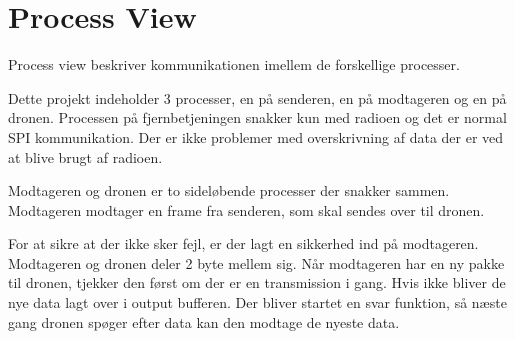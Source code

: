 \documentclass[Main]{subfiles}
\begin{document}
\section{Process View}
Process view beskriver kommunikationen imellem de forskellige processer.

Dette projekt indeholder 3 processer, en på senderen, en på modtageren og en på dronen.
Processen på fjernbetjeningen snakker kun med radioen og det er normal SPI kommunikation. Der er ikke problemer med overskrivning af data der er ved at blive brugt af radioen.

Modtageren og dronen er to sideløbende processer der snakker sammen.
Modtageren modtager en frame fra senderen, som skal sendes over \itoc til dronen.

For at sikre at der ikke sker fejl, er der lagt en sikkerhed ind på modtageren. 
Modtageren og dronen deler 2 byte mellem sig.
Når modtageren har en ny pakke til dronen, tjekker den først om der er en \itoc transmission i gang. 
Hvis ikke bliver de nye data lagt over i output bufferen. 
Der bliver startet en svar funktion, så næste gang dronen spøger efter data kan den modtage de nyeste data.
\end{document}
